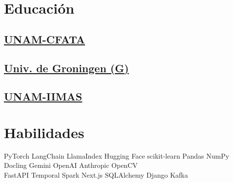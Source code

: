 \documentclass{tex/deedy-resume-openfont}
\begin{document}
\begin{minipage}[t]{0.32\textwidth} 


\section{Educación} 

\subsection{\href{http://www.fata.unam.mx/}{UNAM-CFATA}}
\sectionsep

\subsection{\href{https://www.rug.nl/research/bernoulli/}{Univ. de Groningen (G)}}
\sectionsep

\subsection{\href{https://www.iimas.unam.mx/}{UNAM-IIMAS}}
\sectionsep


\section{Habilidades}

PyTorch \textbullet{} 
LangChain \textbullet{} 
LlamaIndex \textbullet{} 
Hugging Face \textbullet{} 
scikit-learn \textbullet{} 
Pandas \textbullet{} 
NumPy \textbullet{} 
Docling \textbullet{} 
Gemini \textbullet{} 
OpenAI \textbullet{} 
Anthropic \textbullet{} 
OpenCV \\[4pt]

FastAPI \textbullet{} 
Temporal \textbullet{} 
Spark \textbullet{} 
Next.js \textbullet{}
SQLAlchemy \textbullet{} 
Django \textbullet{} 
Kafka \\[4pt]



\end{minipage}
\end{document}
